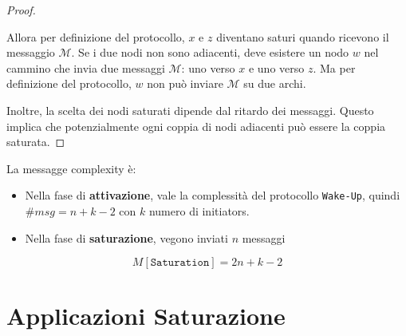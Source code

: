 \begin{teorema}[Correttezza]
\begin{proof}
\begin{description}
\begin{center}
            \end{center}
            Allora per definizione del protocollo, $x$ e $z$ diventano saturi quando ricevono il messaggio $\mathcal{M}$. Se i due nodi non sono adiacenti, deve esistere un nodo $w$ nel cammino che invia due messaggi $\mathcal{M}$: uno verso $x$ e uno verso $z$. Ma per definizione del protocollo, $w$ non può inviare $\mathcal{M}$ su due archi. 
    
        \end{description}
        Inoltre, la scelta dei nodi saturati dipende dal ritardo dei messaggi. Questo implica che potenzialmente ogni coppia di nodi adiacenti può essere la coppia saturata.
    \end{proof}

\end{teorema}

La messagge complexity è:
\begin{itemize}
    \item Nella fase di \textbf{attivazione}, vale la complessità del protocollo \texttt{Wake-Up}, quindi $\# msg = n + k - 2$ con $k$ numero di initiators.
    \item Nella fase di \textbf{saturazione}, vegono inviati $n$ messaggi
\end{itemize}

\[
    M[\texttt{Saturation}] = 2n + k - 2
\]

\section{Applicazioni Saturazione}

